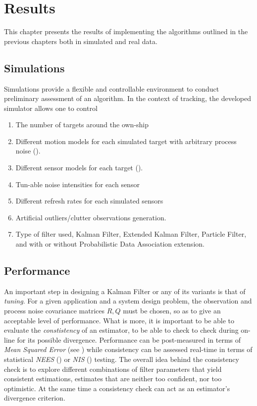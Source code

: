 \chapter{Results}\label{ch:Results}
This chapter presents the results of implementing the algorithms outlined in the previous chapters both in simulated and real data.

\section{Simulations}
Simulations provide a flexible and controllable environment to conduct preliminary assessment of an algorithm. In the context of tracking, the developed simulator allows one to control 
\begin{enumerate}[label=(\alph*)] 
	\item The number of targets around the own-ship
	\item Different motion models for each simulated target with arbitrary process noise ().
	\item Different sensor models for each target ().
	\item Tun-able noise intensities for each sensor
	\item Different refresh rates for each simulated sensors
	\item Artificial outliers/clutter observations generation.
	\item Type of filter used, \ie Kalman Filter, Extended Kalman Filter, Particle Filter, and with or without Probabilistic Data Association extension.
\end{enumerate}

\section{Performance}


An important step in designing a Kalman Filter or any of its variants is that of \emph{tuning}. For a given application and a system design problem, the observation and process noise covariance matrices $R,Q$ must be chosen, so as to give an acceptable level of performance. What is more, it is important to be able to evaluate the \emph{constistency} of an estimator, \ie to be able to check to check during on-line for its possible divergence. Performance can be post-measured in terms of \emph{Mean Squared Error} (see ) while consistency can be assessed real-time in terms of statistical \emph{NEES} () or \emph{NIS} () testing. The overall idea behind the consistency check is to explore different combinations of filter parameters that yield consistent estimations, \ie estimates that are neither too confident, nor too optimistic. At the same time a consistency check can act as an estimator's divergence criterion.

